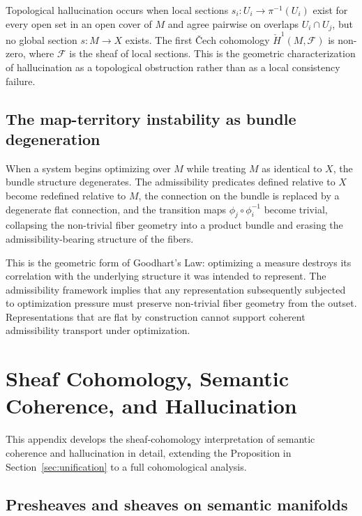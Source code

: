 \documentclass[12pt, a4paper]{article}
\theoremstyle{plain}
\theoremstyle{definition}
\theoremstyle{remark}
\begin{document}
Topological hallucination occurs when local sections $s_i : U_i \to \pi^{-1}(U_i)$
exist for every open set in an open cover of $M$ and agree pairwise on overlaps
$U_i \cap U_j$, but no global section $s : M \to X$ exists. The first \v{C}ech
cohomology $\check{H}^1(M, \mathcal{F})$ is non-zero, where $\mathcal{F}$ is the
sheaf of local sections. This is the geometric characterization of hallucination as
a topological obstruction rather than as a local consistency failure.

\subsection{The map-territory instability as bundle degeneration}

When a system begins optimizing over $M$ while treating $M$ as identical to $X$, the
bundle structure degenerates. The admissibility predicates defined relative to $X$
become redefined relative to $M$, the connection on the bundle is replaced by a
degenerate flat connection, and the transition maps $\phi_j \circ \phi_i^{-1}$ become
trivial, collapsing the non-trivial fiber geometry into a product bundle and erasing
the admissibility-bearing structure of the fibers.

This is the geometric form of Goodhart's Law: optimizing a measure destroys its
correlation with the underlying structure it was intended to represent. The
admissibility framework implies that any representation subsequently subjected to
optimization pressure must preserve non-trivial fiber geometry from the outset.
Representations that are flat by construction cannot support coherent admissibility
transport under optimization.

\section{Sheaf Cohomology, Semantic Coherence, and Hallucination}
\label{app:sheaf}

This appendix develops the sheaf-cohomology interpretation of semantic coherence and
hallucination in detail, extending the Proposition in Section~\ref{sec:unification}
to a full cohomological analysis.

\subsection{Presheaves and sheaves on semantic manifolds}
\end{document}
